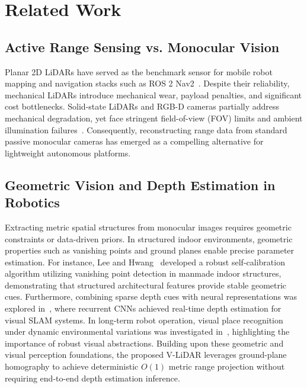 \section{Related Work}

\subsection{Active Range Sensing vs. Monocular Vision}
Planar 2D LiDARs have served as the benchmark sensor for mobile robot mapping and navigation stacks such as ROS 2 Nav2~\cite{macenski2020marathon, macenski2022robot}. Despite their reliability, mechanical LiDARs introduce mechanical wear, payload penalties, and significant cost bottlenecks. Solid-state LiDARs and RGB-D cameras partially address mechanical degradation, yet face stringent field-of-view (FOV) limits and ambient illumination failures~\cite{liu2024review}. Consequently, reconstructing range data from standard passive monocular cameras has emerged as a compelling alternative for lightweight autonomous platforms.

\subsection{Geometric Vision and Depth Estimation in Robotics}
Extracting metric spatial structures from monocular images requires geometric constraints or data-driven priors. In structured indoor environments, geometric properties such as vanishing points and ground planes enable precise parameter estimation. For instance, Lee and Hwang~\cite{lee2020fast} developed a robust self-calibration algorithm utilizing vanishing point detection in manmade indoor structures, demonstrating that structured architectural features provide stable geometric cues. Furthermore, combining sparse depth cues with neural representations was explored in~\cite{lee2020real}, where recurrent CNNs achieved real-time depth estimation for visual SLAM systems. In long-term robot operation, visual place recognition under dynamic environmental variations was investigated in~\cite{lee2019bag}, highlighting the importance of robust visual abstractions. Building upon these geometric and visual perception foundations, the proposed V-LiDAR leverages ground-plane homography to achieve deterministic $O(1)$ metric range projection without requiring end-to-end depth estimation inference.

